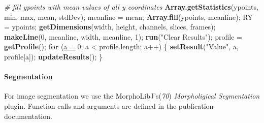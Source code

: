 \documentclass[11pt,singlespacinge,twoside]{reedthesis} %
\newenvironment{Shaded}{}{}
\newcommand{\CommentTok}[1]{\textit{#1}}
\newcommand{\ControlFlowTok}[1]{\textbf{#1}}
\newcommand{\DataTypeTok}[1]{\underline{#1}}
\newcommand{\DecValTok}[1]{#1}
\newcommand{\KeywordTok}[1]{\textbf{#1}}
\newcommand{\NormalTok}[1]{#1}
\newcommand{\OperatorTok}[1]{#1}
\newcommand{\StringTok}[1]{#1}
\theoremstyle{definition}
\theoremstyle{definition}
\theoremstyle{definition}
\theoremstyle{remark}
\begin{document}
\begin{Shaded}
\begin{Highlighting}[numbers=left,,]
\CommentTok{# fill ypoints with mean values of all y coordinates}
    \KeywordTok{Array.getStatistics}\NormalTok{(ypoints, min, max, mean, stdDev);}
\NormalTok{    meanline =}\StringTok{ }\NormalTok{mean;}
    \KeywordTok{Array.fill}\NormalTok{(ypoints, meanline);}
\NormalTok{    RY =}\StringTok{ }\NormalTok{ypoints;}
    \KeywordTok{getDimensions}\NormalTok{(width, height, channels, slices, frames);}
    \KeywordTok{makeLine}\NormalTok{(}\DecValTok{0}\NormalTok{, meanline, width, meanline, }\DecValTok{1}\NormalTok{);}
    \KeywordTok{run}\NormalTok{(}\StringTok{"Clear Results"}\NormalTok{);}
\NormalTok{    profile =}\StringTok{ }\KeywordTok{getProfile}\NormalTok{();}
    \ControlFlowTok{for}\NormalTok{ (}\DataTypeTok{a =} \DecValTok{0}\NormalTok{; a }\OperatorTok{<}\StringTok{ }\NormalTok{profile.length; a}\OperatorTok{++}\NormalTok{) \{}
    \KeywordTok{setResult}\NormalTok{(}\StringTok{"Value"}\NormalTok{, a, profile[a]);}
        \KeywordTok{updateResults}\NormalTok{();}
\NormalTok{    \}}
\end{Highlighting}
\end{Shaded}
\normalsize

\hypertarget{segmentation-2}{%
\paragraph{Segmentation}\label{segmentation-2}}

For image segmentation we use the MorphoLibJ's(\emph{70}) \emph{Morpholigical Segmentation} plugin. Function calls and arguments are defined in the publication documentation.
\end{document}
